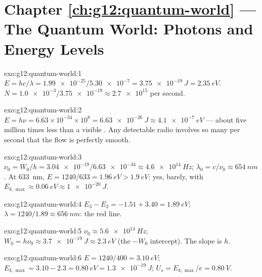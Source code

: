 \section*{Chapter \ref{ch:g12:quantum-world} --- The Quantum World: Photons and Energy Levels}

\begin{solution}{exo:g12:quantum-world:1}
$E = hc/\lambda = \num{1.99e-25}/\num{5.30e-7} = \qty{3.75e-19}{J} =
\qty{2.35}{eV}$. $N = \num{1.0e-3}/\num{3.75e-19} \approx \num{2.7e15}$
 per second.
\end{solution}

\begin{solution}{exo:g12:quantum-world:2}
$E = h\nu = 6.63\times10^{-34} \times 10^{8} = \qty{6.63e-26}{J}
\approx \qty{4.1e-7}{eV}$ --- about five million times less than a
visible . Any detectable radio  involves so many 
per second that the flow is perfectly smooth.
\end{solution}

\begin{solution}{exo:g12:quantum-world:3}
$\nu_0 = W_0/h = \num{3.04e-19}/\num{6.63e-34} \approx
\qty{4.6e14}{Hz}$; $\lambda_0 = c/\nu_0 \approx \qty{654}{nm}$. At
\qty{633}{nm}, $E = 1240/633 = \qty{1.96}{eV} > \qty{1.9}{eV}$: yes,
barely, with $E_{k,\max} \approx \qty{0.06}{eV} \approx \qty{1e-20}{J}$.
\end{solution}

\begin{solution}{exo:g12:quantum-world:4}
$E_3 - E_2 = -1.51 + 3.40 = \qty{1.89}{eV}$;
$\lambda = 1240/1.89 \approx \qty{656}{nm}$: the red line.
\end{solution}

\begin{solution}{exo:g12:quantum-world:5}
$\nu_0 \approx \qty{5.6e14}{Hz}$; $W_0 = h\nu_0 \approx
\qty{3.7e-19}{J} \approx \qty{2.3}{eV}$ (the $-W_0$ intercept). The
slope is  $h$.
\end{solution}

\begin{solution}{exo:g12:quantum-world:6}
$E = 1240/400 = \qty{3.10}{eV}$; $E_{k,\max} = 3.10 - 2.3 =
\qty{0.80}{eV} = \qty{1.3e-19}{J}$; $U_s = E_{k,\max}/e =
\qty{0.80}{V}$.
\end{solution}

